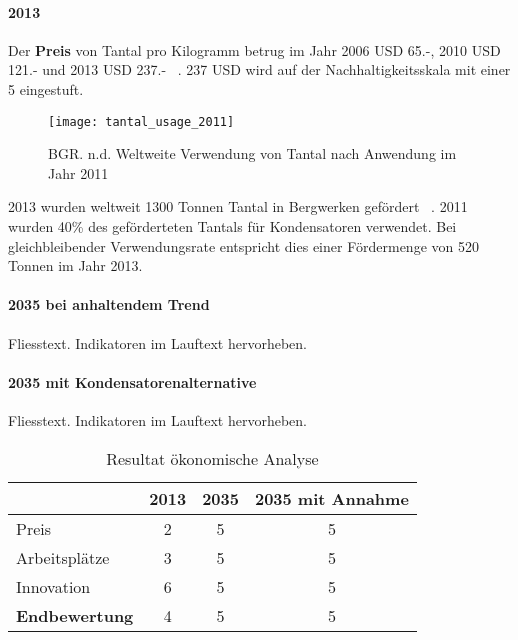 \paragraph{2013}
Der \textbf{Preis} von Tantal pro Kilogramm betrug im Jahr 2006 USD 65.-, 2010 USD 121.- und 2013 USD 237.- ~\cite{tantal_price2}. 237 USD wird auf der Nachhaltigkeitsskala mit einer 5 eingestuft. 
\\
\begin{figure}[h]
\centering
\texttt{[image: tantal\_usage\_2011]}
\caption{BGR. n.d. Weltweite Verwendung von Tantal nach Anwendung im Jahr 2011 ~\cite{tantal_usage}}
\label{}
\end{figure}

2013 wurden weltweit 1300 Tonnen Tantal in Bergwerken gefördert ~\cite{tantal_price2}. 2011 wurden 40\% des geförderteten Tantals für Kondensatoren verwendet. Bei gleichbleibender Verwendungsrate entspricht dies einer Fördermenge von 520 Tonnen im Jahr 2013.
\\


\paragraph{2035 bei anhaltendem Trend}
Fliesstext. Indikatoren im Lauftext hervorheben.

\paragraph{2035 mit Kondensatorenalternative}
Fliesstext. Indikatoren im Lauftext hervorheben.

\begin{table}[h]
  \centering
  \begin{tabular}{l|ccc}            & \textbf{2013} & \textbf{2035} & \textbf{2035 mit Annahme}
    \\ \hline Preis                 & 2             & 5             & 5
    \\ Arbeitsplätze                & 3             & 5             & 5
    \\ Innovation                   & 6             & 5             & 5
    \\ \hline \textbf{Endbewertung} & 4             & 5             & 5
  \end{tabular}
  \caption{Resultat ökonomische Analyse}
\end{table}
